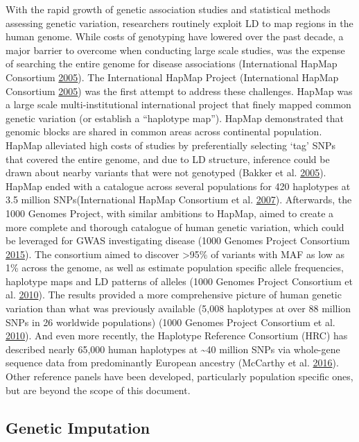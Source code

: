 \documentclass[]{DissertateOSU}
\begin{document}
With the rapid growth of genetic association studies and statistical
methods assessing genetic variation, researchers routinely exploit LD to
map regions in the human genome. While costs of genotyping have lowered
over the past decade, a major barrier to overcome when conducting large
scale studies, was the expense of searching the entire genome for
disease associations (International HapMap Consortium
\protect\hyperlink{ref-hapmap_2005}{2005}). The International HapMap
Project (International HapMap Consortium
\protect\hyperlink{ref-hapmap_2005}{2005}) was the first attempt to
address these challenges. HapMap was a large scale multi-institutional
international project that finely mapped common genetic variation (or
establish a ``haplotype map''). HapMap demonstrated that genomic blocks
are shared in common areas across continental population. HapMap
alleviated high costs of studies by preferentially selecting `tag' SNPs
that covered the entire genome, and due to LD structure, inference could
be drawn about nearby variants that were not genotyped (Bakker et al.
\protect\hyperlink{ref-bakker_2005}{2005}). HapMap ended with a
catalogue across several populations for 420 haplotypes at 3.5 million
SNPs(International HapMap Consortium et al.
\protect\hyperlink{ref-hapmap_2007}{2007}). Afterwards, the 1000 Genomes
Project, with similar ambitions to HapMap, aimed to create a more
complete and thorough catalogue of human genetic variation, which could
be leveraged for GWAS investigating disease (1000 Genomes Project
Consortium \protect\hyperlink{ref-1000genomes}{2015}). The consortium
aimed to discover \textgreater{}95\% of variants with MAF as low as 1\%
across the genome, as well as estimate population specific allele
frequencies, haplotype maps and LD patterns of alleles (1000 Genomes
Project Consortium et al. \protect\hyperlink{ref-1kb_phase1}{2010}). The
results provided a more comprehensive picture of human genetic variation
than what was previously available (5,008 haplotypes at over 88 million
SNPs in 26 worldwide populations) (1000 Genomes Project Consortium et
al. \protect\hyperlink{ref-1kb_phase1}{2010}). And even more recently,
the Haplotype Reference Consortium (HRC) has described nearly 65,000
human haplotypes at \textasciitilde{}40 million SNPs via whole-gene
sequence data from predominantly European ancestry (McCarthy et al.
\protect\hyperlink{ref-hrc}{2016}). Other reference panels have been
developed, particularly population specific ones, but are beyond the
scope of this document.

\subsection{Genetic Imputation}\label{genetic-imputation}
\end{document}

